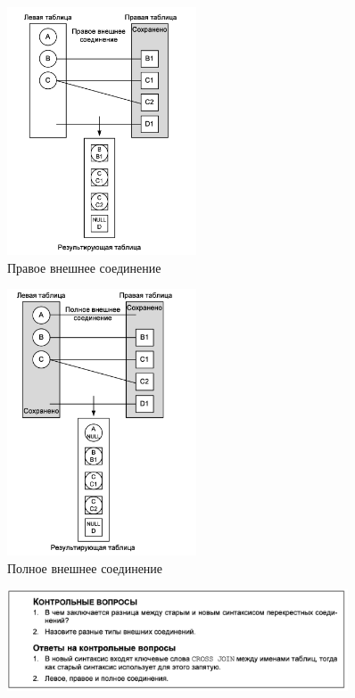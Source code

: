\begin{figure}[h!]
	\begin{center}
		\includegraphics[width=0.5\textwidth]{img/right.png}
	\end{center}
	\caption{Правое внешнее соединение}
	\captionsetup{justification=centering}
\end{figure}

\begin{figure}[h!]
	\begin{center}
		\includegraphics[width=0.5\textwidth]{img/full.png}
	\end{center}
	\captionsetup{justification=centering}
	\caption{Полное внешнее соединение}
\end{figure}


\begin{figure}[h!]
	\begin{center}
		\includegraphics[width=0.9\textwidth]{img/control11.png}
	\end{center}
	\captionsetup{justification=centering}
\end{figure}



